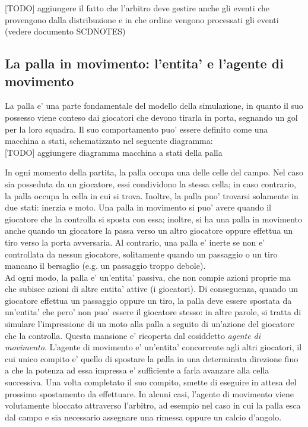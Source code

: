 [TODO] aggiungere il fatto che l'arbitro deve gestire anche gli eventi che provengono dalla distribuzione e in che ordine vengono processati gli eventi (vedere documento SCDNOTES)

\subsection*{La palla in movimento: l'entita' e l'agente di movimento}
%
\label{sec:modello_palla_agente_movimento}


La palla e' una parte fondamentale del modello della simulazione, in quanto il suo possesso viene conteso dai giocatori che devono tirarla in porta, segnando un gol per la loro squadra. Il suo comportamento puo' essere definito come una macchina a stati, schematizzato nel seguente diagramma:\\

[TODO] aggiungere diagramma macchina a stati della palla

In ogni momento della partita, la palla occupa una delle celle del campo. Nel caso sia posseduta da un giocatore, essi condividono la stessa cella; in caso contrario, la palla occupa la cella in cui si trova. Inoltre, la palla puo' trovarsi solamente in due stati: inerzia e moto. Una palla in movimento si puo' avere quando il giocatore che la controlla si sposta con essa; inoltre, si ha una palla in movimento anche quando un giocatore la passa verso un altro giocatore oppure effettua un tiro verso la porta avversaria. Al contrario, una palla e' inerte se non e' controllata da nessun giocatore, solitamente quando un passaggio o un tiro mancano il bersaglio (e.g. un passaggio troppo debole).\\

Ad ogni modo, la palla e' un'entita' passiva, che non compie azioni proprie ma che subisce azioni di altre entita' attive (i giocatori). Di conseguenza, quando un giocatore effettua un passaggio oppure un tiro, la palla deve essere spostata da un'entita' che pero' non puo' essere il giocatore stesso: in altre parole, si tratta di simulare l'impressione di un moto alla palla a seguito di un'azione del giocatore che la controlla. Questa mansione e' ricoperta dal cosiddetto \textit{agente di movimento}. L'agente di movimento e' un'entita' concorrente agli altri giocatori, il cui unico compito e' quello di spostare la palla in una determinata direzione fino a che la potenza ad essa impressa e' sufficiente a farla avanzare alla cella successiva. Una volta completato il suo compito, smette di eseguire in attesa del prossimo spostamento da effettuare. In alcuni casi, l'agente di movimento viene volutamente bloccato attraverso l'arbitro, ad esempio nel caso in cui la palla esca dal campo e sia necessario assegnare una rimessa oppure un calcio d'angolo.

